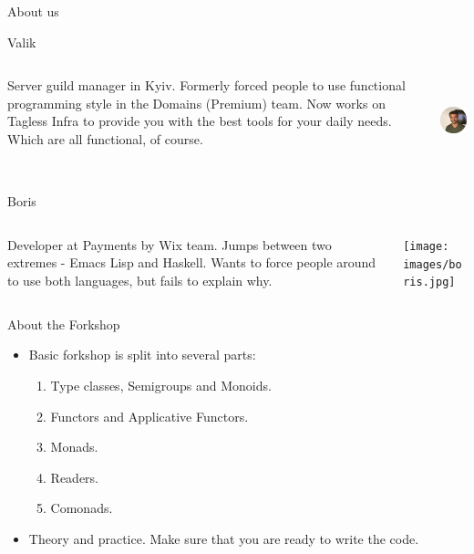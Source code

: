\documentclass[presentation,aspectratio=169,smaller]{beamer}
\begin{document}
\begin{frame}[label={sec:org8afab83}]{About us}
\vspace*{20px}

\begin{block}{Valik}
\begin{columns}
\begin{column}{0.75\columnwidth}
Server guild manager in Kyiv. Formerly forced people to use functional
programming style in the Domains (Premium) team. Now works on Tagless Infra to
provide you with the best tools for your daily needs. Which are all functional,
of course.
\end{column}

\begin{column}{0.25\columnwidth}
\begin{center}
\includegraphics[height=2.5cm]{images/valik.png}
\end{center}

\pause
\end{column}
\end{columns}
\end{block}

\begin{block}{Boris}
\begin{columns}
\begin{column}{0.75\columnwidth}
Developer at Payments by Wix team. Jumps between two extremes - Emacs Lisp and
Haskell. Wants to force people around to use both languages, but fails to
explain why.
\end{column}

\begin{column}{0.25\columnwidth}
\begin{center}
\texttt{[image: images/boris.jpg]}
\end{center}
\end{column}
\end{columns}
\end{block}
\end{frame}

\begin{frame}[label={sec:org66e6c45}]{About the Forkshop}
\begin{itemize}
\item Basic forkshop is split into several parts:
\begin{enumerate}
\item Type classes, Semigroups and Monoids.
\item Functors and Applicative Functors.
\item Monads.
\item Readers.
\item Comonads.
\end{enumerate}
\item Theory and practice. Make sure that you are ready to write the code.
\end{itemize}
\end{frame}
\end{document}
